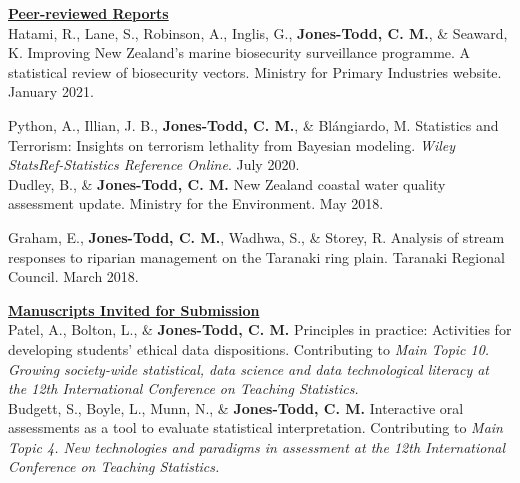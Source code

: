 \documentclass[10pt,a4paper]{moderncv}
\begin{document}
\vspace{2pt} 

\underline{\textbf{Peer-reviewed Reports}}\\

Hatami, R., Lane, S., Robinson, A.,  Inglis, G.,  \textbf{Jones-Todd, C. M.}, \& Seaward, K. Improving New Zealand’s marine biosecurity surveillance programme. A statistical review of biosecurity vectors.  Ministry for Primary Industries website. January 2021.\\

\vspace{-3pt}

Python, A.,  Illian, J. B., \textbf{Jones-Todd, C. M.}, \& Bl\'{a}ngiardo, M. Statistics and Terrorism: Insights on terrorism lethality from Bayesian modeling. \textit{Wiley StatsRef-Statistics Reference Online}. July 2020.\\

Dudley, B., \& \textbf{Jones-Todd, C. M.} New Zealand coastal water quality assessment update. Ministry for the Environment. May 2018.\\

\vspace{-3pt}

Graham, E., \textbf{Jones-Todd, C. M.}, Wadhwa, S., \& Storey, R. Analysis of stream responses to riparian management on the Taranaki ring plain. Taranaki Regional Council. March 2018.\\

\vspace{2pt}




\underline{\textbf{Manuscripts Invited for Submission}}\\

Patel, A., Bolton, L., \& \textbf{Jones-Todd, C. M.} Principles in practice: Activities for developing students' ethical data dispositions. Contributing to \textit{Main Topic 10. Growing society-wide statistical, data science and data technological literacy at the 12th International Conference on Teaching Statistics.}\\

Budgett, S., Boyle, L., Munn, N.,  \& \textbf{Jones-Todd, C. M.} Interactive oral assessments as a tool to evaluate statistical interpretation. Contributing to \textit{Main Topic 4. New technologies and paradigms in assessment at the 12th International Conference on Teaching Statistics.}\\
\end{document}

